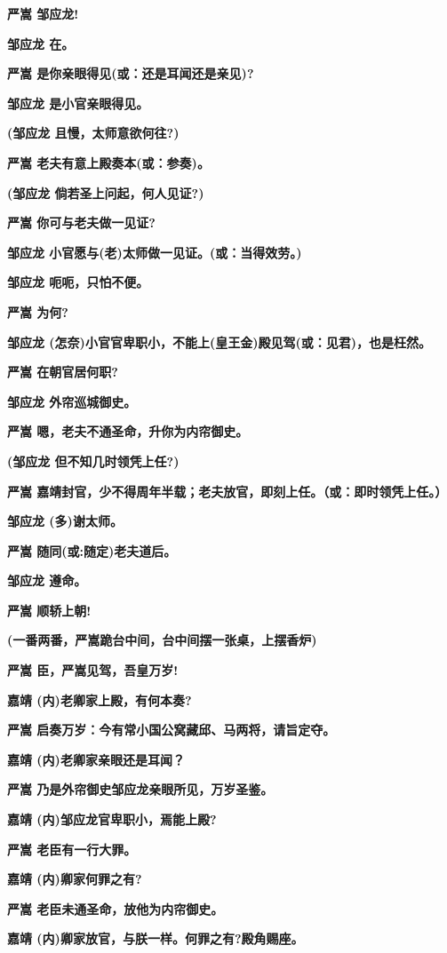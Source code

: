\textbf{严嵩 邹应龙!}

\textbf{邹应龙 在。}

\textbf{严嵩 是你亲眼得见(或：还是耳闻还是亲见)?}

\textbf{邹应龙 是小官亲眼得见。}

\textbf{(邹应龙 且慢，太师意欲何往?)}

\textbf{严嵩 老夫有意上殿奏本(或：参奏)。}

\textbf{(邹应龙 倘若圣上问起，何人见证?)}

\textbf{严嵩 你可与老夫做一见证?}

\textbf{邹应龙 小官愿与(老)太师做一见证。(或：当得效劳。)}

\textbf{邹应龙 呃呃，只怕不便。}

\textbf{严嵩 为何?}

\textbf{邹应龙
(怎奈)小官官卑职小，不能上(皇王金)殿见驾(或：见君)，也是枉然。}

\textbf{严嵩 在朝官居何职?}

\textbf{邹应龙 外帘巡城御史。}

\textbf{严嵩 嗯，老夫不通圣命，升你为内帘御史。}

\textbf{(邹应龙 但不知几时领凭上任?)}

\textbf{严嵩
嘉靖封官，少不得周年半载；老夫放官，即刻上任。（或：即时领凭上任。）}

\textbf{邹应龙 (多)谢太师。}

\textbf{严嵩 随同(或:随定)老夫道后。}

\textbf{邹应龙 遵命。}

\textbf{严嵩 顺轿上朝!}

\textbf{(一番两番，严嵩跪台中间，台中间摆一张桌，上摆香炉)}

\textbf{严嵩 臣，严嵩见驾，吾皇万岁!}

\textbf{嘉靖 (内)老卿家上殿，有何本奏?}

\textbf{严嵩 启奏万岁：今有常小国公窝藏邱、马两将，请旨定夺。}

\textbf{嘉靖 (内)老卿家亲眼还是耳闻？}

\textbf{严嵩 乃是外帘御史邹应龙亲眼所见，万岁圣鉴。}

\textbf{嘉靖 (内)邹应龙官卑职小，焉能上殿?}

\textbf{严嵩 老臣有一行大罪。}

\textbf{嘉靖 (内)卿家何罪之有?}

\textbf{严嵩 老臣未通圣命，放他为内帘御史。}

\textbf{嘉靖 (内)卿家放官，与朕一样。何罪之有?殿角赐座。}

